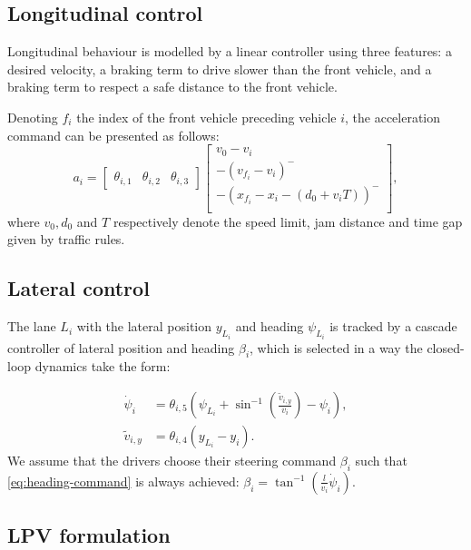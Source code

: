 \documentclass{article}
\begin{document}
\subsection{Longitudinal control}
Longitudinal behaviour is modelled by a linear controller using three features: a desired velocity, a braking term to drive slower than the front vehicle, and a braking term to respect a safe distance to the front vehicle.

Denoting $f_i$ the index of the front vehicle preceding vehicle $i$, the acceleration command can be presented as follows:
\begin{equation*}
	a_i = \begin{bmatrix}
	\theta_{i,1} & \theta_{i,2} & \theta_{i,3}
	\end{bmatrix} \begin{bmatrix}
		v_0 - v_i \\
		-(v_{f_i}-v_i)^- \\
		-(x_{f_i} - x_i - (d_0 + v_iT))^- \\
	\end{bmatrix},
	\label{eq:theta_a}
\end{equation*}
where $v_0, d_0$ and $T$ respectively denote the speed limit, jam distance and time gap given by traffic rules.

\subsection{Lateral control}

The lane $L_i$ with the lateral position $y_{L_i}$ and heading $\psi_{L_i}$ is tracked by a cascade controller of lateral position and heading $\beta_i$, which is selected in a way the closed-loop dynamics take the form:

\begin{align}
	\label{eq:heading-command}
    \dot{\psi}_i &= \theta_{i,5}\left(\psi_{L_i}+\sin^{-1}\left(\frac{\tilde{v}_{i,y}}{v_i}\right)-\psi_i\right),\\
    \tilde{v}_{i,y} &= \theta_{i,4} (y_{L_i}-y_i). \nonumber
\end{align}
We assume that the drivers choose their steering command $\beta_i$ such that \eqref{eq:heading-command} is always achieved: $\beta_i = \tan^{-1}(\frac{l}{v_i}\dot{\psi}_i)$.

\subsection{LPV formulation}
\end{document}
